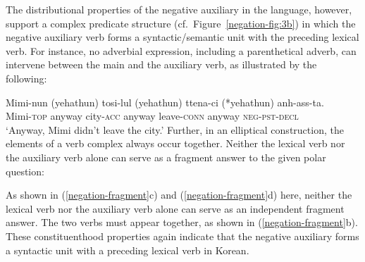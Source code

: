 \documentclass[output=paper
	        ,collection
	        ,collectionchapter
 	        ,biblatex
                ,babelshorthands
                ,newtxmath
                ,draftmode
                ,colorlinks, citecolor=brown
]{langscibook}
\begin{document}
{\begin{exe}
\begin{xlist}
\begin{exe}
\begin{xlist}
The distributional properties of the negative auxiliary in the language, however, support
 a complex predicate structure (cf.\ Figure~\ref{negation-fig:3b}) in which the negative auxiliary verb
forms a syntactic/semantic unit with the preceding lexical verb.
For instance, no adverbial expression, including
a parenthetical adverb, can intervene between
the main and the auxiliary verb, as illustrated by the
following:

\ea
\gll Mimi-nun          (yehathun)           tosi-lul          (yehathun)           ttena-ci            (*yehathun) anh-ass-ta. \\
     Mimi-\textsc{top} anyway city-\textsc{acc} anyway leave-\textsc{conn} anyway \textsc{neg}-\textsc{pst}-\textsc{decl} \\
\glt `Anyway, Mimi didn't leave the city.'
\z
%
Further, in an elliptical construction, the elements of a verb complex
 always occur together. Neither the lexical  verb nor the auxiliary verb alone can serve
as a fragment answer to the given polar question:

\eal
\label{negation-fragment}
\zl

%
%
%
%
As shown in (\ref{negation-fragment}c) and (\ref{negation-fragment}d) here, neither the lexical verb nor the auxiliary verb alone can serve as an independent fragment answer. The two
verbs must appear together, as shown in (\ref{negation-fragment}b). These constituenthood
properties again indicate that the negative auxiliary forms
a syntactic unit with a preceding lexical  verb in Korean.


\end{xlist}
\end{exe}
\end{xlist}
\end{exe}}
\end{document}
